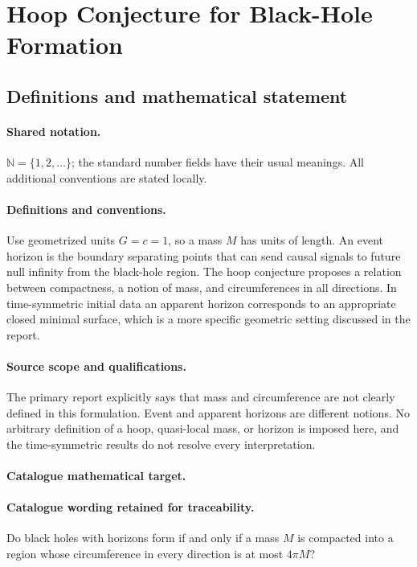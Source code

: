 \documentclass[11pt]{article}
\begin{document}
\section{Hoop Conjecture for Black-Hole Formation}\label{statement}

\subsection{Definitions and mathematical statement}

\paragraph{Shared notation.}$\mathbb N=\{1,2,\ldots\}$; the standard number fields have their usual meanings. All additional conventions are stated locally.


\paragraph{Definitions and conventions.} Use geometrized units $G=c=1$, so a mass $M$ has units of length. An event horizon is the boundary separating points that can send causal signals to future null infinity from the black-hole region. The hoop conjecture proposes a relation between compactness, a notion of mass, and circumferences in all directions. In time-symmetric initial data an apparent horizon corresponds to an appropriate closed minimal surface, which is a more specific geometric setting discussed in the report.

\paragraph{Source scope and qualifications.} The primary report explicitly says that mass and circumference are not clearly defined in this formulation. Event and apparent horizons are different notions. No arbitrary definition of a hoop, quasi-local mass, or horizon is imposed here, and the time-symmetric results do not resolve every interpretation.

\paragraph{Catalogue mathematical target.}
\paragraph{Catalogue wording retained for traceability.}
Do black holes with horizons form if and only if a mass $M$ is compacted into a region whose circumference in every direction is at most $4\pi M$?
\end{document}
